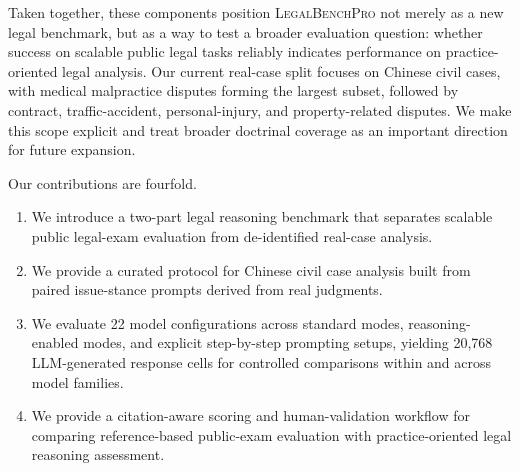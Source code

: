 Taken together, these components position \textsc{LegalBenchPro} not merely as a new
legal benchmark, but as a way to test a broader evaluation question: whether success
on scalable public legal tasks reliably indicates performance on practice-oriented
legal analysis. Our current real-case split focuses on Chinese civil cases, with
medical malpractice disputes forming the largest subset, followed by contract,
traffic-accident, personal-injury, and property-related disputes. We make this scope
explicit and treat broader doctrinal coverage as an important direction for future
expansion.

Our contributions are fourfold.

\begin{enumerate}
    \item We introduce a two-part legal reasoning benchmark that separates scalable
    public legal-exam evaluation from de-identified real-case analysis.

    \item We provide a curated protocol for Chinese civil case analysis built from
    paired issue-stance prompts derived from real judgments.

    \item We evaluate 22 model configurations across standard modes,
    reasoning-enabled modes, and explicit step-by-step prompting setups, yielding
    20,768 LLM-generated response cells for controlled comparisons within and
    across model families.

    \item We provide a citation-aware scoring and human-validation workflow for
    comparing reference-based public-exam evaluation with practice-oriented legal
    reasoning assessment.
\end{enumerate}
